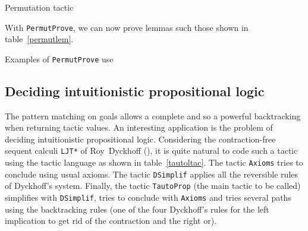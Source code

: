 \begin{table}[p]
\noindent{}
\caption{Permutation tactic}
\label{permutltac}
\end{table}

With {\tt PermutProve}, we can now prove lemmas such those shown in
table~\ref{permutlem}.

\begin{table}[p]
\noindent{}
\caption{Examples of {\tt PermutProve} use}
\label{permutlem}
\end{table}

\subsection{Deciding intuitionistic propositional logic}

The pattern matching on goals allows a complete and so a powerful
backtracking when returning tactic values. An interesting application is the
problem of deciding intuitionistic propositional logic. Considering the
contraction-free sequent calculi {\tt LJT*} of Roy~Dyckhoff (\cite{Dyc92}), it
is quite natural to code such a tactic using the tactic language as shown in
table~\ref{tautoltac}. The tactic {\tt Axioms} tries to conclude using usual
axioms. The tactic {\tt DSimplif} applies all the reversible rules of Dyckhoff's
system. Finally, the tactic {\tt TautoProp} (the main tactic to be called)
simplifies with {\tt DSimplif}, tries to conclude with {\tt Axioms} and tries
several paths using the backtracking rules (one of the four Dyckhoff's rules
for the left implication to get rid of the contraction and the right or).

